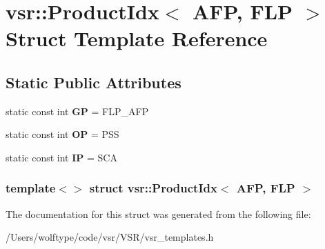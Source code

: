 \hypertarget{structvsr_1_1_product_idx_3_01_a_f_p_00_01_f_l_p_01_4}{\section{vsr\-:\-:Product\-Idx$<$ A\-F\-P, F\-L\-P $>$ Struct Template Reference}
\label{structvsr_1_1_product_idx_3_01_a_f_p_00_01_f_l_p_01_4}
}
\subsection*{Static Public Attributes}
\begin{DoxyCompactItemize}
\item 
\hypertarget{structvsr_1_1_product_idx_3_01_a_f_p_00_01_f_l_p_01_4_a818c52f6ed7ae1231c8905b09de0024a}{static const int {\bfseries G\-P} = F\-L\-P\-\_\-\-A\-F\-P}\label{structvsr_1_1_product_idx_3_01_a_f_p_00_01_f_l_p_01_4_a818c52f6ed7ae1231c8905b09de0024a}

\item 
\hypertarget{structvsr_1_1_product_idx_3_01_a_f_p_00_01_f_l_p_01_4_a325ece2fba58e8e5f2f51d9e38dae89d}{static const int {\bfseries O\-P} = P\-S\-S}\label{structvsr_1_1_product_idx_3_01_a_f_p_00_01_f_l_p_01_4_a325ece2fba58e8e5f2f51d9e38dae89d}

\item 
\hypertarget{structvsr_1_1_product_idx_3_01_a_f_p_00_01_f_l_p_01_4_a43383f858f506d8feabbfe9b2fb63f12}{static const int {\bfseries I\-P} = S\-C\-A}\label{structvsr_1_1_product_idx_3_01_a_f_p_00_01_f_l_p_01_4_a43383f858f506d8feabbfe9b2fb63f12}

\end{DoxyCompactItemize}
\subsubsection*{template$<$$>$ struct vsr\-::\-Product\-Idx$<$ A\-F\-P, F\-L\-P $>$}



The documentation for this struct was generated from the following file\-:\begin{DoxyCompactItemize}
\item 
/\-Users/wolftype/code/vsr/\-V\-S\-R/vsr\-\_\-templates.\-h\end{DoxyCompactItemize}
